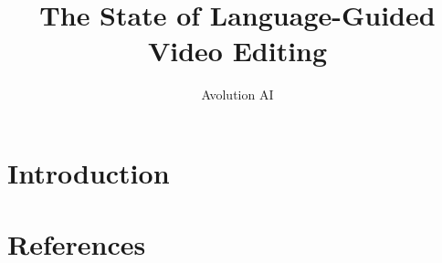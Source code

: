 \documentclass{article}
\title{The State of Language-Guided Video Editing}
\author{%
  Avolution AI
}
\begin{document}
\maketitle


\begin{abstract}

\end{abstract}


\section{Introduction}



\section*{References}
\end{document}
